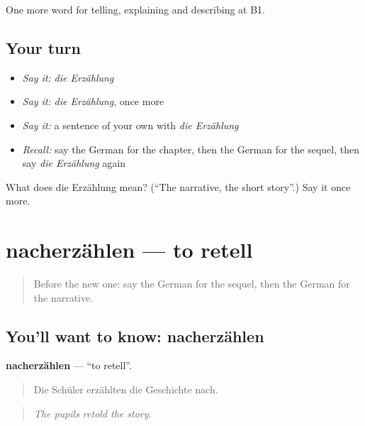 \begin{grammarlens}[title={What you've built}]
One more word for telling, explaining and describing at B1.
\end{grammarlens}

\subsection*{Your turn}
\begin{itemize}
\raggedright
  \item \emph{Say it:} \emph{die Erzählung}
  \item \emph{Say it:} \emph{die Erzählung}, once more
  \item \emph{Say it:} a sentence of your own with \emph{die Erzählung}
  \item \emph{Recall:} say the German for the chapter, then the German for the sequel, then say \emph{die Erzählung} again
\end{itemize}

\begin{tcolorbox}[breakable,colback=teal!4,colframe=teal!35!black,title={Before you move on}]
What does die Erzählung mean? (\textquotedblleft{}The narrative, the short story\textquotedblright{}.) Say it once more.
\end{tcolorbox}
\section[nacherzählen]{nacherzählen — to retell}

\label{lesson:GE-C317-nacherzaehlen}



\begin{quote}
Before the new one: say the German for the sequel, then the German for the narrative.
\end{quote}

\subsection*{You'll want to know: nacherzählen}
\textbf{nacherzählen} — \textquotedblleft{}to retell\textquotedblright{}.

\begin{quote}
Die Schüler erzählten die Geschichte nach.
\end{quote}

\begin{quote}
\emph{The pupils retold the story.}
\end{quote}

